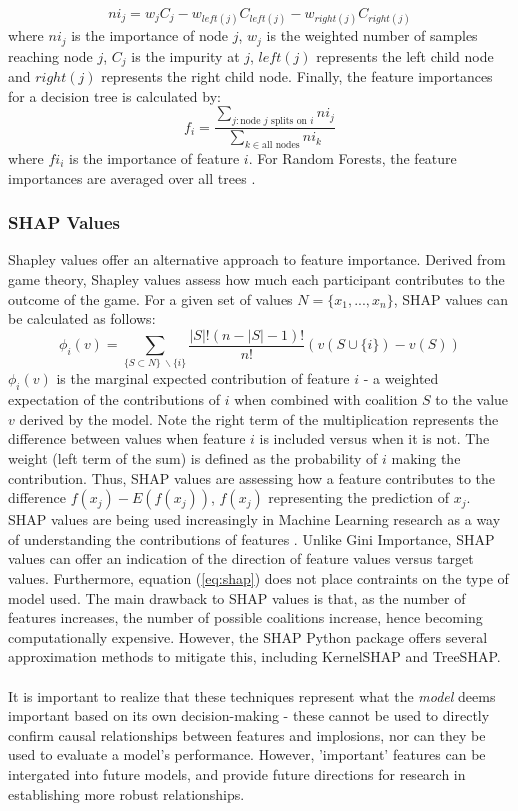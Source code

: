 \documentclass[a4paper]{report}
\begin{document}
\begin{equation}
  ni_j = w_jC_j - w_{left(j)}C_{left(j)} - w_{right(j)}C_{right(j)}
\end{equation}
where \(ni_j\) is the importance of node \(j\), \(w_j\) is the weighted number of samples reaching node \(j\), \(C_j\) is the impurity at \(j\), \(left(j)\) represents the left child node and \(right(j)\) represents the right child node.
Finally, the feature importances for a decision tree is calculated by:
\begin{equation}
  f_i = \frac{\sum_{j: \text{node \(j\) splits on \(i\)}}ni_j}{\sum_{k \in \text{all nodes}}ni_k}
\end{equation}
where \(fi_i\) is the importance of feature \(i\). For Random Forests, the feature importances are averaged over all trees \citep{gini_importance}.

\subsubsection{SHAP Values}
Shapley values offer an alternative approach to feature importance. Derived from game theory, Shapley values assess how much each participant contributes to the outcome of the game. For a given set 
of values \(N = \{x_1, ... , x_n\}\), SHAP values can be calculated as follows:
\begin{equation}
  \phi_i(v) = \sum_{\{S \subset N\}\ \backslash\{i\}}  \frac{|S|!(n-|S|-1)!}{n!}(v(S \cup \{i\}) - v(S)) \label{eq:shap}
\end{equation}
\(\phi_i(v)\) is the marginal expected contribution of feature \(i\) - a weighted expectation of the contributions of \(i\) when 
combined with coalition \(S\) to the value \(v\) derived by the model. Note the right term of the multiplication represents the difference between 
values when feature \(i\) is included versus when it is not. The weight (left term of the sum) is defined as the probability of \(i\) making the contribution. Thus, SHAP values 
are assessing how a feature contributes to the difference \(f(x_j) - E(f(x_j))\), \(f(x_j)\) representing the prediction of \(x_j\).
SHAP values are being used increasingly 
in Machine Learning research as a way of understanding the contributions of features \citep{bluwstein2023credit}. Unlike Gini Importance, SHAP values 
can offer an indication of the direction of feature values versus target values. Furthermore, equation (\ref{eq:shap}) does not place contraints on the type of model used. The 
main drawback to SHAP values is that, as the number of features increases, the number of possible coalitions increase, hence becoming computationally expensive. However, the SHAP Python package 
offers several approximation methods to mitigate this, including KernelSHAP and TreeSHAP.\\\\It is important to realize that these techniques represent what the \textit{model} deems important based on 
its own decision-making - these cannot be used to directly confirm causal relationships between features and implosions, nor can they be used to evaluate a model's performance. However, 'important' features can be intergated into future models, and provide 
future directions for research in establishing more robust relationships.
\end{document}
